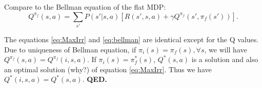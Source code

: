 \documentclass{article} %
\newtheorem{definition}{Definition}
\newtheorem{theorem}{Theorem}
\newcommand{\suchthat}{ \mathrel{\ooalign{$\ni$\cr\kern-1pt$-$\kern-6.5pt$-$}}}
\begin{document}
Compare to the Bellman equation of the flat MDP:
\begin{equation}
    Q^{\pi_f}(s, a) = \sum_{s'}P(s'|s, a)[R(s', s, a) + \gamma Q^{\pi_f}(s', \pi_f(s'))].
    \label{eq:bellman}
\end{equation}

The equations \ref{eq:MaxIrr} and \ref{eq:bellman} are identical except for the Q values.
Due to uniqueness of Bellman equation, if $\pi_i(s) = \pi_f(s), \forall s$, we will have $Q^{\pi_f}(s, a) = Q^{\pi_f}(i, s, a)$. 
If $\pi_i(s) = \pi^*_f(s)$, $Q^*(s, a)$ is a solution and also an optimal solution (why?) of equation \ref{eq:MaxIrr}.
Thus we have $Q^*(i, s, a) = Q^*(s, a)$. \textbf{QED.}




\end{document}
